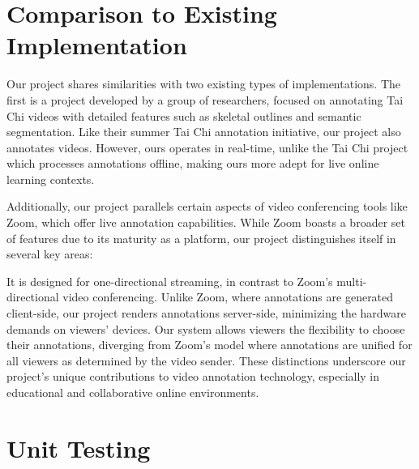 \documentclass[12pt, titlepage]{article}
\begin{document}
\section{Comparison to Existing Implementation}

Our project shares similarities with two existing types of implementations. The
first is a project developed by a group of researchers, focused on annotating
Tai Chi videos with detailed features such as skeletal outlines and semantic
segmentation. Like their summer Tai Chi annotation initiative, our project also
annotates videos. However, ours operates in real-time, unlike the Tai Chi
project which processes annotations offline, making ours more adept for live
online learning contexts.

Additionally, our project parallels certain aspects of video conferencing tools
like Zoom, which offer live annotation capabilities. While Zoom boasts a broader
set of features due to its maturity as a platform, our project distinguishes
itself in several key areas:

It is designed for one-directional streaming, in contrast to Zoom's
multi-directional video conferencing. Unlike Zoom, where annotations are
generated client-side, our project renders annotations server-side, minimizing
the hardware demands on viewers' devices. Our system allows viewers the
flexibility to choose their annotations, diverging from Zoom's model where
annotations are unified for all viewers as determined by the video sender. These
distinctions underscore our project's unique contributions to video annotation
technology, especially in educational and collaborative online environments.

\section{Unit Testing}
\end{document}
